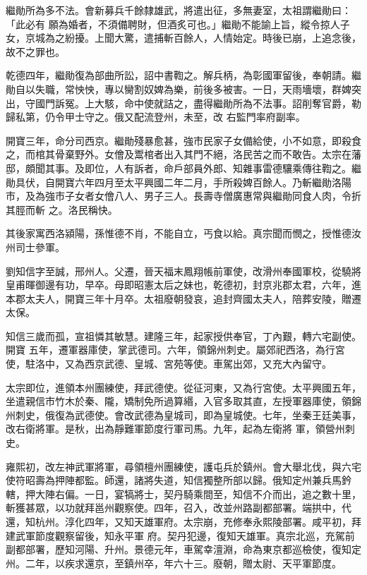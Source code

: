 \begin{pinyinscope}
 繼勛所為多不法。會新募兵千餘隸雄武，將遣出征，多無妻室，太祖謂繼勛曰：「此必有
 願為婚者，不須備聘財，但酒炙可也。」繼勛不能諭上旨，縱令掠人子女，京城為之紛擾。上聞大驚，遣捕斬百餘人，人情始定。時後已崩，上追念後，故不之罪也。



 乾德四年，繼勛復為部曲所訟，詔中書鞫之。解兵柄，為彰國軍留後，奉朝請。繼勛自以失職，常怏怏，專以臠割奴婢為樂，前後多被害。一日，天雨墻壞，群婢突出，守國門訴冤。上大駭，命中使就詰之，盡得繼勛所為不法事。詔削奪官爵，勒歸私第，仍令甲士守之。俄又配流登州，未至，改
 右監門率府副率。



 開寶三年，命分司西京。繼勛殘暴愈甚，強市民家子女備給使，小不如意，即殺食之，而棺其骨棄野外。女儈及鬻棺者出入其門不絕，洛民苦之而不敢告。太宗在藩邸，頗聞其事。及即位，人有訴者，命戶部員外郎、知雜事雷德驤乘傳往鞫之。繼勛具伏，自開寶六年四月至太平興國二年二月，手所殺婢百餘人。乃斬繼勛洛陽市，及為強市子女者女儈八人、男子三人。長壽寺僧廣惠常與繼勛同食人肉，令折其脛而斬
 之。洛民稱快。



 其後家寓西洛潁陽，孫惟德不肖，不能自立，丐食以給。真宗聞而憫之，授惟德汝州司士參軍。



 劉知信字至誠，邢州人。父遷，晉天福末鳳翔帳前軍使，改滑州奉國軍校，從驍將皇甫暉御邊有功，早卒。母即昭憲太后之妹也，乾德初，封京兆郡太君，六年，進本郡太夫人，開寶三年十月卒。太祖廢朝發哀，追封齊國太夫人，陪葬安陵，贈遷太保。



 知信三歲而孤，宣祖憐其敏慧。建隆三年，起家授供奉官，丁內艱，轉六宅副使。開寶
 五年，遷軍器庫使，掌武德司。六年，領錦州刺史。屬郊祀西洛，為行宮使，駐洛中，又為西京武德、皇城、宮苑等使。車駕出郊，又充大內留守。



 太宗即位，進領本州團練使，拜武德使。從征河東，又為行宮使。太平興國五年，坐遣親信市竹木於秦、隴，矯制免所過算緡，入官多取其直，左授軍器庫使，領錦州刺史，俄復為武德使。會改武德為皇城司，即為皇城使。七年，坐秦王廷美事，改右衛將軍。是秋，出為靜難軍節度行軍司馬。九年，起為左衛將
 軍，領營州刺史。



 雍熙初，改左神武軍將軍，尋領檀州團練使，護屯兵於鎮州。會大舉北伐，與六宅使符昭壽為押陣都監。師還，諸將失道，知信獨整所部以歸。俄知定州兼兵馬鈐轄，押大陣右偏。一日，宴犒將士，契丹騎乘間至，知信不介而出，追之數十里，斬獲甚眾，以功就拜邕州觀察使。四年，召入，改並州路副都部署。端拱中，代還，知杭州。淳化四年，又知天雄軍府。太宗崩，充修奉永熙陵部署。咸平初，拜建武軍節度觀察留後，知永平軍
 府。契丹犯邊，復知天雄軍。真宗北巡，充駕前副都部署，歷知河陽、升州。景德元年，車駕幸澶淵，命為東京都巡檢使，復知定州。二年，以疾求還京，至鎮州卒，年六十三。廢朝，贈太尉、天平軍節度。




\end{pinyinscope}
